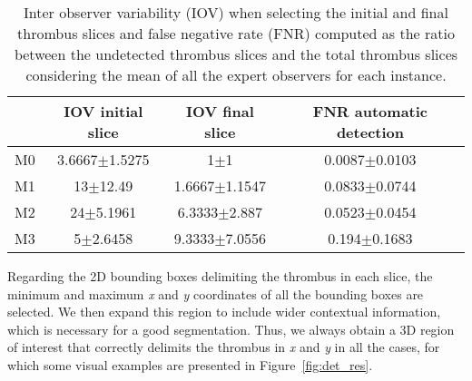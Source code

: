 \documentclass[preprint,authoryear,12pt]{elsarticle}
\begin{document}

\begin{table}[htbp]
\centering
\begin{tabular}{c|c|c|c}
\hline{} & {IOV initial slice} & {IOV final slice} & {FNR automatic detection}\\
\hline{M0} & {3.6667\(\pm\)1.5275} &  {1\(\pm\)1} & {0.0087\(\pm\)0.0103} \\
{M1} & {13\(\pm\)12.49} &  {1.6667\(\pm\)1.1547} & {0.0833\(\pm\)0.0744} \\
{M2} & {24\(\pm\)5.1961} &  {6.3333\(\pm\)2.887} & {0.0523\(\pm\)0.0454} \\
{M3} & {5\(\pm\)2.6458} &  {9.3333\(\pm\)7.0556} & {0.194\(\pm\)0.1683} \\
\end{tabular}
\caption{\label{tab:detect fn}Inter observer variability (IOV) when selecting the initial and final thrombus slices and false negative rate (FNR) computed as the ratio between the undetected thrombus slices and the total thrombus slices considering the mean of all the expert observers for each instance.}
\end{table}

Regarding the 2D bounding boxes delimiting the thrombus in each slice, the minimum and maximum \textit{x} and \textit{y} coordinates of all the bounding boxes are selected. We then expand this region to include wider contextual information, which is necessary for a good segmentation. Thus, we always obtain a 3D region of interest that correctly delimits the thrombus in \textit{x} and \textit{y} in all the cases, for which some visual examples are presented in Figure~\ref{fig:det_res}.
\end{document}
